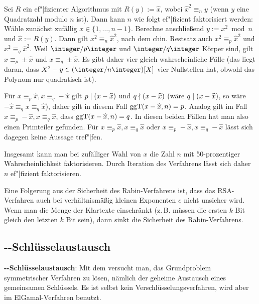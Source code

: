 \begin{Beweis}
    Sei $R$ ein ef"|fizienter Algorithmus mit $R(y) := \widehat{x}$, wobei
    $\widehat{x}^2 \equiv_n y$ (wenn $y$ eine Quadratzahl modulo $n$ ist).
    Dann kann $n$ wie folgt ef"|fizient faktorisiert werden:
    Wähle zunächst zufällig $x \in \{1, \dotsc, n - 1\}$.
    Berechne anschließend $y := x^2 \bmod n$ und $\widehat{x} := R(y)$.
    Dann gilt $x^2 \equiv_n \widehat{x}^2$, nach dem chin. Restsatz auch
    $x^2 \equiv_p \widehat{x}^2$ und $x^2 \equiv_q \widehat{x}^2$.
    Weil $\ZpZ$ und $\ZqZ$ Körper sind, gilt
    $x \equiv_p \pm\widehat{x}$ und $x \equiv_q \pm\widehat{x}$.
    Es gibt daher vier gleich wahrscheinliche Fälle
    (das liegt daran, dass $X^2 - y \in (\integer/n\integer)[X]$ vier Nullstellen hat,
    obwohl das Polynom nur quadratisch ist).
    
    Für $x \equiv_p \widehat{x}, x \equiv_q -\widehat{x}$
    gilt $p \mid (x - \widehat{x})$ und $q \nmid (x - \widehat{x})$
    (wäre $q \mid (x - \widehat{x})$, so wäre
    $ -\widehat{x} \equiv_q x \equiv_q \widehat{x}$),
    daher gilt in diesem Fall $\operatorname{ggT}(x - \widehat{x}, n) = p$.
    Analog gilt im Fall $x \equiv_p -\widehat{x}, x \equiv_q \widehat{x}$,
    dass $\operatorname{ggT}(x - \widehat{x}, n) = q$.
    In diesen beiden Fällen hat man also einen Primteiler gefunden.
    Für $x \equiv_p \widehat{x}, x \equiv_q \widehat{x}$ oder
    $x \equiv_p -\widehat{x}, x \equiv_q -\widehat{x}$ lässt sich dagegen keine
    Aussage tref"|fen.
    
    Insgesamt kann man bei zufälliger Wahl von $x$ die Zahl $n$ mit 50-prozentiger
    Wahrscheinlichkeit faktorisieren.
    Durch Iteration des Verfahrens lässt sich daher $n$ ef"|fizient faktorisieren.
\end{Beweis}

Eine Folgerung aus der Sicherheit des Rabin-Verfahrens ist, dass das RSA-Verfahren auch bei
verhältnismäßig kleinen Exponenten $e$ nicht unsicher wird.
Wenn man die Menge der Klartexte einschränkt (z.\,B. müssen die ersten $k$ Bit gleich den
letzten $k$ Bit sein), dann sinkt die Sicherheit des Rabin-Verfahrens.

\pagebreak

\subsection{%
    --Schlüsselaustausch%
}

\textbf{--Schlüsselaustausch}:
Mit dem  versucht man, das Grundproblem
symmetrischer Verfahren zu lösen,
nämlich der geheime Austausch eines gemeinsamen Schlüssels.
Es ist selbst kein Verschlüsselungsverfahren, wird aber im ElGamal-Verfahren benutzt.

